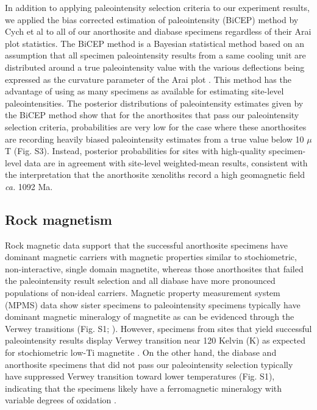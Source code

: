 \documentclass[9pt,twocolumn,twoside,lineno]{pnas-new}
\begin{document}
In addition to applying paleointensity selection criteria to our experiment results, we applied the bias corrected estimation of paleointensity (BiCEP) method by Cych et al \cite{Cych2021a} to all of our anorthosite and diabase specimens regardless of their Arai plot statistics. The BiCEP method is a Bayesian statistical method based on an assumption that all specimen paleointensity results from a same cooling unit are distributed around a true paleointensity value with the various deflections being expressed as the curvature parameter of the Arai plot \cite{Arai1963a, Paterson2011a}. This method has the advantage of using as many specimens as available for estimating site-level paleointensities. The posterior distributions of paleointensity estimates given by the BiCEP method show that for the anorthosites that pass our paleointensity selection criteria, probabilities are very low for the case where these anorthosites are recording heavily biased paleointensity estimates from a true value below 10 $\mu$T (Fig. S3). Instead, posterior probabilities for sites with high-quality specimen-level data are in agreement with site-level weighted-mean results, consistent with the interpretation that the anorthosite xenoliths record a high geomagnetic field \textit{ca.} 1092 Ma. 


\subsection*{Rock magnetism}
Rock magnetic data support that the successful anorthosite specimens have dominant magnetic carriers with magnetic properties similar to stochiometric, non-interactive, single domain magnetite, whereas those anorthosites that failed the paleointensity result selection and all diabase have more pronounced populations of non-ideal carriers. Magnetic property measurement system (MPMS) data show sister specimens to paleointensity specimens typically have dominant magnetic mineralogy of magnetite as can be evidenced through the Verwey transitions (Fig. S1; \citealp{Verwey1939a}). However, specimens from sites that yield successful paleointensity results display Verwey transition near 120 Kelvin (K) as expected for stochiometric low-Ti magnetite \cite{Ozdemir1993a}. On the other hand, the diabase and anorthosite specimens that did not pass our paleointensity selection typically have suppressed Verwey transition toward lower temperatures (Fig. S1), indicating that the specimens likely have a ferromagnetic mineralogy with variable degrees of oxidation \cite{Ozdemir1993a}. 
 
\end{document}
